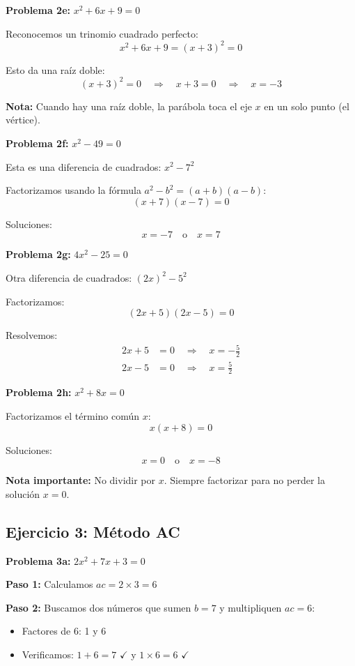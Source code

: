\textbf{Problema 2e:} $x^2 + 6x + 9 = 0$

Reconocemos un trinomio cuadrado perfecto:
$$x^2 + 6x + 9 = (x + 3)^2 = 0$$

Esto da una raíz doble:
$$(x + 3)^2 = 0 \quad \Rightarrow \quad x + 3 = 0 \quad \Rightarrow \quad x = -3$$

\textbf{Nota:} Cuando hay una raíz doble, la parábola toca el eje $x$ en un solo punto (el vértice).

\textbf{Problema 2f:} $x^2 - 49 = 0$

Esta es una diferencia de cuadrados: $x^2 - 7^2$

Factorizamos usando la fórmula $a^2 - b^2 = (a+b)(a-b)$:
$$(x + 7)(x - 7) = 0$$

Soluciones:
$$x = -7 \quad \text{o} \quad x = 7$$

\textbf{Problema 2g:} $4x^2 - 25 = 0$

Otra diferencia de cuadrados: $(2x)^2 - 5^2$

Factorizamos:
$$(2x + 5)(2x - 5) = 0$$

Resolvemos:
\begin{align}
2x + 5 &= 0 \quad \Rightarrow \quad x = -\frac{5}{2}\\
2x - 5 &= 0 \quad \Rightarrow \quad x = \frac{5}{2}
\end{align}

\textbf{Problema 2h:} $x^2 + 8x = 0$

Factorizamos el término común $x$:
$$x(x + 8) = 0$$

Soluciones:
$$x = 0 \quad \text{o} \quad x = -8$$

\textbf{Nota importante:} No dividir por $x$. Siempre factorizar para no perder la solución $x = 0$.


\subsection*{Ejercicio 3: Método AC}

\textbf{Problema 3a:} $2x^2 + 7x + 3 = 0$

\textbf{Paso 1:} Calculamos $ac = 2 \times 3 = 6$

\textbf{Paso 2:} Buscamos dos números que sumen $b = 7$ y multipliquen $ac = 6$:
\begin{itemize}
\item Factores de 6: 1 y 6
\item Verificamos: $1 + 6 = 7$ $\checkmark$ y $1 \times 6 = 6$ $\checkmark$
\end{itemize}

